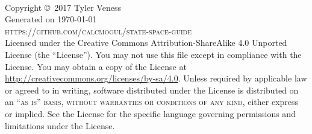 \begingroup
\thispagestyle{empty}
\vfill
\endgroup

\newpage
~\vfill
\thispagestyle{empty}

\noindent Copyright \copyright\ 2017 Tyler Veness \\

\noindent Generated on \monthdayyeardate\today \\

\noindent \textsc{https://github.com/calcmogul/state-space-guide} \\

\noindent Licensed under the Creative Commons Attribution-ShareAlike 4.0
Unported License (the ``License''). You may not use this file except in
compliance with the License. You may obtain a copy of the License at
\url{http://creativecommons.org/licenses/by-sa/4.0}. Unless required by
applicable law or agreed to in writing, software distributed under the License
is distributed on an \textsc{``as is'' basis, without warranties or conditions
of any kind}, either express or implied. See the License for the specific
language governing permissions and limitations under the License. \\



\pagestyle{empty} %

\tableofcontents %

\cleardoublepage

\pagestyle{fancy} %
